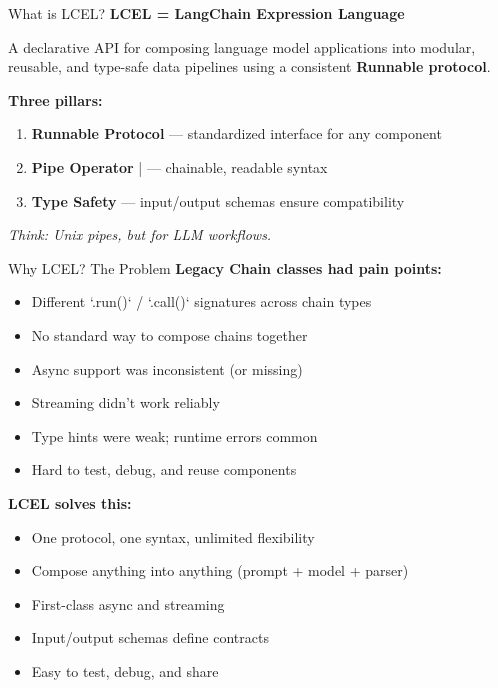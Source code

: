 \documentclass[aspectratio=169,11pt]{beamer}
\begin{document}
\begin{frame}{What is LCEL?}
  \textbf{LCEL = LangChain Expression Language}

  \vspace{0.3em}
  \begin{conceptbox}[Definition]
    A declarative API for composing language model applications into modular,
    reusable, and type-safe data pipelines using a consistent \textbf{Runnable protocol}.
  \end{conceptbox}

  \vspace{0.3em}
  \textbf{Three pillars:}
  \begin{enumerate}\setlength{\itemsep}{1pt}
    \item \textbf{Runnable Protocol} — standardized interface for any component
    \item \textbf{Pipe Operator} | — chainable, readable syntax
    \item \textbf{Type Safety} — input/output schemas ensure compatibility
  \end{enumerate}

  \vspace{0.3em}
  \textit{Think: Unix pipes, but for LLM workflows.}
\end{frame}

\begin{frame}{Why LCEL? The Problem}
  \textbf{Legacy Chain classes had pain points:}

  \begin{itemize}\setlength{\itemsep}{1pt}
    \item Different `.run()` / `.call()` signatures across chain types
    \item No standard way to compose chains together
    \item Async support was inconsistent (or missing)
    \item Streaming didn't work reliably
    \item Type hints were weak; runtime errors common
    \item Hard to test, debug, and reuse components
  \end{itemize}

  \vspace{0.3em}
  \textbf{LCEL solves this:}

  \begin{itemize}\setlength{\itemsep}{1pt}
    \item One protocol, one syntax, unlimited flexibility
    \item Compose anything into anything (prompt + model + parser)
    \item First-class async and streaming
    \item Input/output schemas define contracts
    \item Easy to test, debug, and share
  \end{itemize}
\end{frame}
\end{document}
